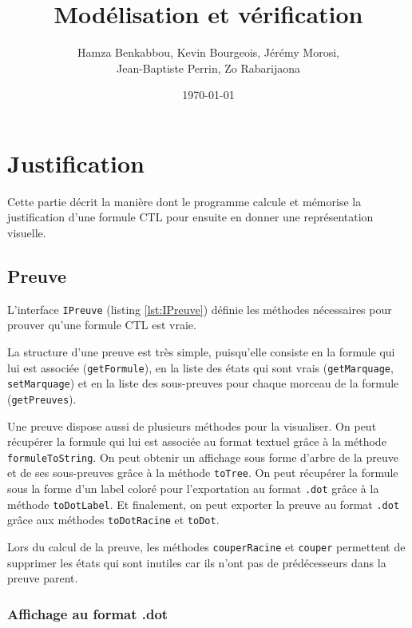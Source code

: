 \documentclass[dvipsnames]{report}
\begin{document}
\title{Modélisation et vérification}   %
\author{Hamza Benkabbou, Kevin Bourgeois, Jérémy Morosi,\\Jean-Baptiste Perrin, Zo Rabarijaona}         %
\date{\today}    %
\maketitle

\newpage

\section{Justification}

Cette partie décrit la manière dont le programme calcule et mémorise la justification d'une formule CTL pour ensuite en donner une représentation visuelle.

\subsection{Preuve}

L'interface \texttt{IPreuve} (listing \ref{lst:IPreuve}) définie les méthodes nécessaires pour prouver qu'une formule CTL est vraie. 

La structure d'une preuve est très simple, puisqu'elle consiste en la formule qui lui est associée (\texttt{getFormule}), en la liste des états qui sont vrais (\texttt{getMarquage}, \texttt{setMarquage}) et en la liste des sous-preuves pour chaque morceau de la formule (\texttt{getPreuves}).

Une preuve dispose aussi de plusieurs méthodes pour la visualiser. On peut récupérer la formule qui lui est associée au format textuel grâce à la méthode \texttt{formuleToString}. On peut obtenir un affichage sous forme d'arbre de la preuve et de ses sous-preuves grâce à la méthode \texttt{toTree}. On peut récupérer la formule sous la forme d'un label coloré pour l'exportation au format \texttt{.dot} grâce à la méthode \texttt{toDotLabel}. Et finalement, on peut exporter la preuve au format \texttt{.dot} grâce aux méthodes \texttt{toDotRacine} et \texttt{toDot}.

Lors du calcul de la preuve, les méthodes \texttt{couperRacine} et \texttt{couper} permettent de supprimer les états qui sont inutiles car ils n'ont pas de prédécesseurs dans la preuve parent.

\subsubsection{Affichage au format .dot}
\end{document}
